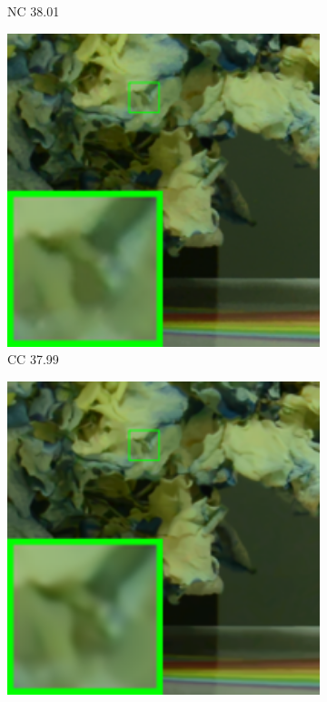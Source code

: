 \begin{figure}
\begin{subfigure}[t]{0.19\textwidth}
		\caption{NC 38.01}
    \end{subfigure}
    \hfill
    \begin{subfigure}[t]{0.19\textwidth}
        \centering
        \includegraphics[width=1\textwidth]{images/twsc/cc/resize_br_CCNoise_d800_iso1600_1.png}
		\caption{CC 37.99}
    \end{subfigure}
    \hfill
    \begin{subfigure}[t]{0.19\textwidth}
        \centering
        \includegraphics[width=1\textwidth]{images/twsc/cc/resize_br_TWSC_d800_iso1600_1.png}

\end{subfigure}
\end{figure}
